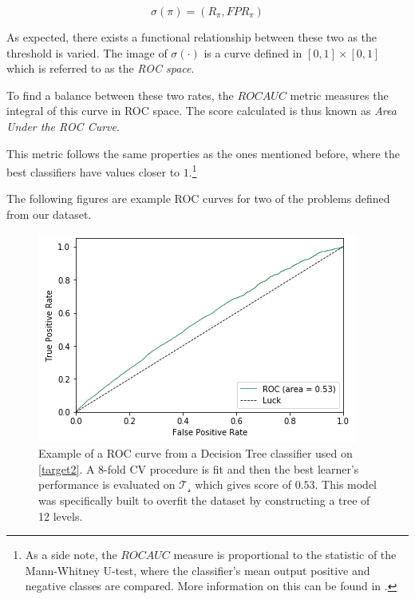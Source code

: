 \begin{equation}
\sigma(\pi) = (R_\pi, FPR_\pi)
\end{equation}

As expected, there exists a functional relationship between these two as the threshold is varied.
The image of $\sigma(\cdot)$ is a curve defined in $[0,1]\times[0,1]$ which is referred to as the \textit{ROC space}.

To find a balance between these two rates, the $ROC AUC$ metric measures the integral of this curve in ROC space.
The score calculated is thus known as \textit{Area Under the ROC Curve}.

This metric follows the same properties as the ones mentioned before, where the best classifiers have values closer to $1$.\footnote{As a side note, the $ROC AUC$ measure is proportional to the statistic of the Mann-Whitney U-test, where the classifier's mean output positive and negative classes are compared.
More information on this can be found in \citep{mason-rocAucRelationship}.}

The following figures are example ROC curves for two of the problems defined from our dataset.


\begin{figure}[h!]
\begin{center}
\includegraphics[width=1\columnwidth]{figures/figure-lowROCAUC/figure-lowROCAUC_original}
\caption{Example of a ROC curve from a Decision Tree classifier used on \cref{target2}. A 8-fold CV procedure is fit and then the best learner's performance is evaluated on $\mathcal{T_s}$ which gives score of $0.53$. This model was specifically built to overfit the dataset by constructing a tree of 12 levels.}
\label{fg:lowROCAUC}
\end{center}
\end{figure}

